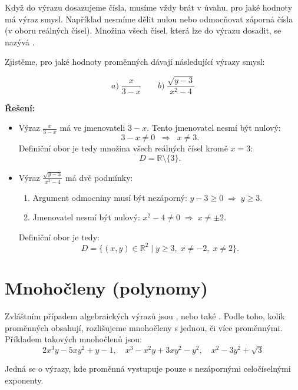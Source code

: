 \documentclass[12pt,a4paper]{article}
\begin{document}
\noindent
Když do výrazu dosazujeme čísla, musíme vždy brát v úvahu, pro jaké hodnoty má výraz smysl. Například nesmíme dělit nulou nebo odmocňovat záporná čísla (v oboru reálných čísel). Množina všech čísel, která lze do výrazu dosadit, se nazývá .  

\begin{examplebox}
Zjistěme, pro jaké hodnoty proměnných dávají následující výrazy smysl:

\[
a)\; \frac{x}{3-x} \qquad b)\; \frac{\sqrt{y-3}}{x^2-4}
\]

\textbf{Řešení:}

\begin{itemize}
    \item[a)] Výraz $\frac{x}{3-x}$ má ve jmenovateli $3-x$. Tento jmenovatel nesmí být nulový:  
    \[
    3 - x \neq 0 \;\;\Rightarrow\;\; x \neq 3.
    \]
    Definiční obor je tedy množina všech reálných čísel kromě $x=3$:  
    \[
    D = \mathbb{R} \setminus \{3\}.
    \]

    \item[b)] Výraz $\frac{\sqrt{y-3}}{x^2-4}$ má dvě podmínky:
    \begin{enumerate}
        \item Argument odmocniny musí být nezáporný: $y - 3 \geq 0 \;\Rightarrow\; y \geq 3$.
        \item Jmenovatel nesmí být nulový: $x^2 - 4 \neq 0 \;\Rightarrow\; x \neq \pm 2$.
    \end{enumerate}

    Definiční obor je tedy:  
    \[
    D = \{(x,y) \in \mathbb{R}^2 \;|\; y \geq 3, \; x \neq -2, \; x \neq 2 \}.
    \]
\end{itemize}
\end{examplebox}



\section{Mnohočleny (polynomy)}

Zvláštním případem algebraických výrazů jsou , nebo také .
Podle toho, kolik proměnných obsahují, rozlišujeme mnohočleny s jednou, či více proměnnými. 
Příkladem takových mnohočlenů jsou:
\[
2x^3y - 5xy^2 + y - 1, \quad x^3 - x^2y + 3xy^2 - y^2, \quad x^2 - 3y^2 + \sqrt{3}
\]

Jedná se o výrazy, kde proměnná vystupuje pouze s nezápornými celočíselnými exponenty.  
\end{document}
